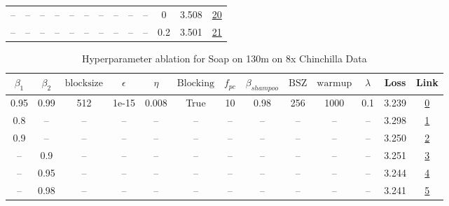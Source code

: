 \begin{table}[H]
\begin{tabular}{ccccccccccccc}
-- & -- & -- & -- & -- & -- & -- & -- & -- & -- & 0 & 3.508 & \href{https://wandb.ai/stanford-mercury/optimizer-scaling/runs/sweep-130m-2B-soapl222613lr0.016-wd0-minlr0-warmup1000-b10.95-b2-cae71c}{20} \\
-- & -- & -- & -- & -- & -- & -- & -- & -- & -- & 0.2 & 3.501 & \href{https://wandb.ai/stanford-mercury/optimizer-scaling/runs/sweep-130m-2B-soapl3db00flr0.016-wd0.2-minlr0-warmup1000-b10.95--173d5a}{21} \\
\bottomrule
\end{tabular}
\end{table}

\begin{table}[H]
\centering
\caption{Hyperparameter ablation for Soap on 130m on 8x Chinchilla Data}
\label{tab:ablation_soap_130m_8}
\begin{tabular}{ccccccccccccc}
\toprule
$\beta_1$ & $\beta_2$ & $\mathrm{block size}$ & $\epsilon$ & $\eta$ & $\mathrm{Blocking}$ & $f_{pc}$ & $\beta_{shampoo}$ & $\mathrm{BSZ}$ & $\mathrm{warmup}$ & $\lambda$ & Loss & Link \\
\midrule
0.95 & 0.99 & 512 & 1e-15 & 0.008 & True & 10 & 0.98 & 256 & 1000 & 0.1 & 3.239 & \href{https://wandb.ai/stanford-mercury/optimizer-scaling/runs/sweep-130m-21B-soape2479ablr0.008-wd0.1-minlr0-warmup1000-b10.95-a17efa}{0} \\
\midrule
0.8 & -- & -- & -- & -- & -- & -- & -- & -- & -- & -- & 3.298 & \href{https://wandb.ai/stanford-mercury/optimizer-scaling/runs/sweep-130m-21B-soape2d8ee9lr0.008-wd0.1-minlr0-warmup1000-b10.8--cbb0fb}{1} \\
0.9 & -- & -- & -- & -- & -- & -- & -- & -- & -- & -- & 3.250 & \href{https://wandb.ai/stanford-mercury/optimizer-scaling/runs/sweep-130m-21B-soape5dcf61lr0.008-wd0.1-minlr0-warmup1000-b10.9--69f18f}{2} \\
-- & 0.9 & -- & -- & -- & -- & -- & -- & -- & -- & -- & 3.251 & \href{https://wandb.ai/stanford-mercury/optimizer-scaling/runs/sweep-130m-21B-soape812156lr0.008-wd0.1-minlr0-warmup1000-b10.95-a40bb0}{3} \\
-- & 0.95 & -- & -- & -- & -- & -- & -- & -- & -- & -- & 3.244 & \href{https://wandb.ai/stanford-mercury/optimizer-scaling/runs/sweep-130m-21B-soape28447clr0.008-wd0.1-minlr0-warmup1000-b10.95-fe0c4b}{4} \\
-- & 0.98 & -- & -- & -- & -- & -- & -- & -- & -- & -- & 3.241 & \href{https://wandb.ai/stanford-mercury/optimizer-scaling/runs/sweep-130m-21B-soape111b71lr0.008-wd0.1-minlr0-warmup1000-b10.95-80abaa}{5} \\

\end{tabular}
\end{table}
